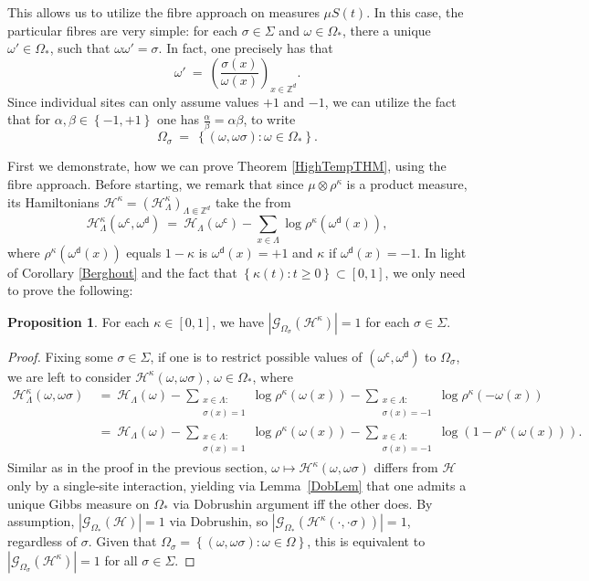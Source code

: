 \documentclass[12pt]{article}
\newcommand{\G}{\mathcal{G}}
\renewcommand{\H}{\mathcal{H}}
\newcommand{\Z}{\mathbb{Z}}
\newcommand{\set}[1]{\left\{#1\right\}}
\newcommand{\oklepaj}[1]{\left(#1\right)}
\newcommand{\pika}{\boldsymbol{\cdot}}
\newcommand{\1}{\mathbbm{1}}
\renewcommand{\c}{\mathsf{c}}
\newcommand{\5}{\vspace{0.5cm}}
\theoremstyle{definition}
\newtheorem{prop}[thm]{Proposition}
\begin{document}
This allows us to utilize the fibre approach on measures $\mu S(t)$. In this case, the particular fibres are very simple: for each $\sigma\in\Sigma$ and $\omega\in\Omega_*$, there a unique $\omega'\in\Omega_*$, such that $\omega\omega'=\sigma$. In fact, one precisely has that
$$\omega' ~=~ \oklepaj{\frac{\sigma(x)}{\omega(x)}}_{x\in\Z^d}.$$
Since individual sites can only assume values $+1$ and $-1$, we can utilize the fact that for $\alpha,\beta\in\set{-1,+1}$ one has $\frac{\alpha}{\beta}=\alpha\beta$, to write
$$\Omega_\sigma ~=~ \set{(\omega,\omega\sigma):\omega\in\Omega_*}.$$ 

First we demonstrate, how we can prove Theorem \ref{HighTempTHM}, using the fibre approach.  Before starting, we remark that since $\mu\otimes\rho^\kappa$ is a product measure, its Hamiltonians $\H^\kappa=(\H_\Lambda^\kappa)_{\Lambda\Subset\Z^d}$ take the from
$$\H_\Lambda^\kappa(\omega^\c,\omega^\mathsf{d}) ~=~ \H_\Lambda(\omega^\c)-\sum_{x\in\Lambda}\log\rho^\kappa(\omega^\mathsf{d}(x)),$$
where $\rho^\kappa(\omega^\mathsf{d}(x))$ equals $1-\kappa$ is $\omega^\mathsf{d}(x)=+1$ and $\kappa$ if $\omega^\mathsf{d}(x)=-1$.
In light of Corollary \ref{Berghout} and the fact that $\set{\kappa(t):t\geq 0}\subset[0,1]$, we only need to prove the following:

\begin{prop}\label{HighTempAlt}
For each $\kappa\in[0,1]$, we have $|\G_{\Omega_\sigma}(\H^\kappa)|=1$ for each $\sigma\in\Sigma$.
\end{prop}

\begin{proof}
Fixing some $\sigma\in\Sigma$, if one is to restrict possible values of $(\omega^\c,\omega^\mathsf{d})$ to $\Omega_\sigma$, we are left to consider $\H^\kappa(\omega,\omega\sigma)$, $\omega\in\Omega_*$, where
\begin{align*}
\H_\Lambda^\kappa(\omega,\omega\sigma) ~&=~ \H_\Lambda(\omega) - \sum_{\substack{x\in\Lambda:\\\sigma(x)=1}}\log\rho^\kappa(\omega(x)) - \sum_{\substack{x\in\Lambda:\\\sigma(x)=-1}}\log\rho^\kappa(-\omega(x)) \\
&=~ \H_\Lambda(\omega) - \sum_{\substack{x\in\Lambda:\\\sigma(x)=1}}\log\rho^\kappa(\omega(x)) - \sum_{\substack{x\in\Lambda:\\\sigma(x)=-1}}\log\!\oklepaj{1-\rho^\kappa(\omega(x))}.
\end{align*}
Similar as in the proof in the previous section, $\omega\mapsto\H^\kappa(\omega,\omega\sigma)$ differs from $\H$ only by a single-site interaction, yielding via Lemma~\ref{DobLem} that one admits a unique Gibbs measure on $\Omega_*$ via Dobrushin argument iff the other does. By assumption, $|\G_{\Omega_*}(\H)|=1$ via Dobrushin, so $|\G_{\Omega_*}(\H^\kappa(\pika,\pika\sigma))|=1$, regardless of $\sigma$. Given that $\Omega_\sigma=\set{(\omega,\omega\sigma):\omega\in\Omega}$, this is equivalent to $|\G_{\Omega_\sigma}(\H^\kappa)|=1$ for all $\sigma\in\Sigma$.
\end{proof}
\end{document}
